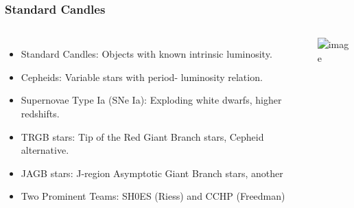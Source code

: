 \documentclass[aspectratio=169]{beamer}
\begin{document}
\begin{frame}
    \frametitle{Standard Candles}
    \begin{columns}
        \begin{itemize}
            \item Standard Candles: Objects with known intrinsic luminosity. 
            \item<2> Cepheids: Variable stars with period- luminosity relation.  \hfill {}
            \item<2> Supernovae Type Ia (SNe Ia): Exploding white dwarfs, higher redshifts. \hfill {}
            \item<2> TRGB stars: Tip of the Red Giant Branch stars, Cepheid alternative. \hfill {}
            \item<2> JAGB stars: J-region Asymptotic Giant Branch stars, another \hfill {}
            \item<2> Two Prominent Teams: SH0ES (Riess) and CCHP (Freedman)
        \end{itemize}
        \includegraphics<1>[width=\textwidth]{figures/candles.jpg}%
    \end{columns}
\end{frame}
\end{document}
